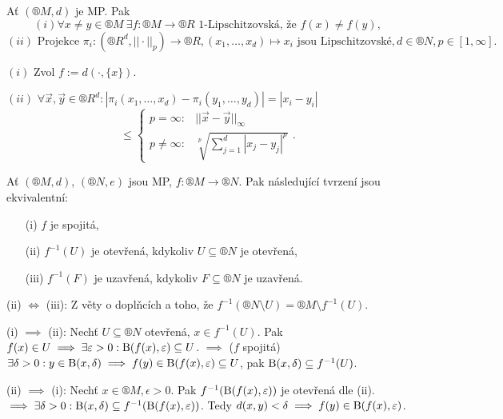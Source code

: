 \documentclass[12pt]{article}					%
\begin{document}
    \begin{lemma}
        Ať $(®M, d)$ je MP. Pak
        $$ (i) \forall x ≠ y \in ®M\ \exists f: ®M \rightarrow ®R \text{ 1-Lipschitzovská, že } f(x) ≠ f(y), $$
        $$ (ii) \text{ Projekce } \pi_i: (®R^d, ||·||_p) \rightarrow ®R, (x_1, …, x_d) \mapsto x_i \text{ jsou Lipschitzovské}, d \in ®N, p \in [1, ∞]. $$

        \begin{dukazin}
            $(i)$ Zvol $f:=d(·, \{x\})$.

            $(ii)$ $\forall \vec{x}, \vec{y} \in ®R^d: |\pi_i(x_1, …, x_d) - \pi_i(y_1, …, y_d)| = |x_i - y_i|$
            $$ ≤ \begin{cases} p = ∞: & ||\vec{x} - \vec{y}||_∞ \\ p≠∞: & \sqrt[p]{\sum_{j=1}^d |x_j - y_j|^p} \end{cases}. $$ 
        \end{dukazin}
    \end{lemma}

    \begin{tvrzeni}
        Ať $(®M, d)$, $(®N, e)$ jsou MP, $f: ®M \rightarrow ®N$. Pak následující tvrzení jsou ekvivalentní:
        
        \begin{itemize}
            \item[(i)] $f$ je spojitá,
            \item[(ii)] $f^{-1}(U)$ je otevřená, kdykoliv $U \subseteq ®N$ je otevřená,
            \item[(iii)] $f^{-1}(F)$ je uzavřená, kdykoliv $F \subseteq ®N$ je uzavřená.
        \end{itemize}

        \begin{dukazin}
            (ii) $\Leftrightarrow$ (iii): Z věty o doplňcích a toho, že $f^{-1}(®N \setminus U) = ®M \setminus f^{-1}(U)$.

            (i) $\implies$ (ii): Nechť $U \subseteq ®N$ otevřená, $x \in f^{-1}(U)$. Pak $f(x) \in U \implies \exists \varepsilon > 0: \operatorname{B}(f(x), \varepsilon) \subseteq U$. $\implies$ ($f$ spojitá) $\exists \delta > 0: y \in \operatorname{B}(x, \delta) \implies f(y) \in \operatorname{B}(f(x), \varepsilon) \subseteq U$, pak $\operatorname{B}(x, \delta) \subseteq f^{-1}(U)$.

            (ii) $\implies$ (i): Nechť $x \in ®M, \epsilon > 0$. Pak $f^{-1}(\operatorname{B}(f(x), \varepsilon))$ je otevřená dle (ii). $\implies \exists \delta > 0: \operatorname{B}(x, \delta) \subseteq f^{-1}(\operatorname{B}(f(x), \varepsilon))$. Tedy $d(x, y) < \delta \implies f(y) \in \operatorname{B}(f(x), \varepsilon)$.
        \end{dukazin}
    \end{tvrzeni}
\end{document}

